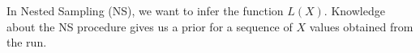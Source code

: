 \documentclass[a4paper, 11pt]{article}
\title{}
\author{}
\begin{document}
\maketitle

In Nested Sampling (NS), we want to infer the function $L(X)$.
Knowledge about the NS procedure gives us a prior for a sequence of $X$ values
obtained from the run.
\end{document}
